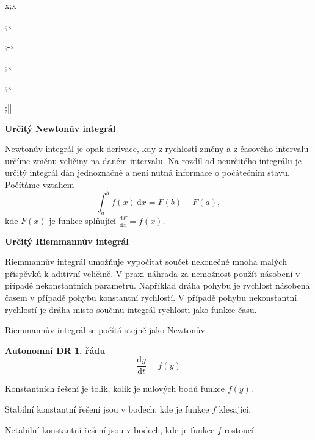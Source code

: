 \documentclass{article}
\def\tg{\mathop{\mathrm{tg}}}
\def\arctg{\mathop{\mathrm{arctg}}}
\def\cotg{\mathop{\mathrm{cotg}}}
\begin{document}
\begin{multicols}{3}
{{\begin{minipage}[t]{0.42\linewidth}
  \integral \cos x;\sin x

\end{minipage}\hfil\vrule\hfil
\begin{minipage}[t]{0.53\linewidth}
\parskip 3pt

  \integral {};\tg x

  \integral {};-\cotg x


  \integral {};\arcsin x

  \integral {};\arctg x

  \integral {};\ln\left|\right|

\end{minipage}}
}



\textbf{Určitý Newtonův integrál}

Newtonův integrál je opak derivace, kdy z rychlosti změny a z časového intervalu určíme změnu veličiny na daném intervalu. Na rozdíl od neurčitého integrálu je určitý integrál dán jednoznačně a není nutná informace o počátečním stavu. Počítáme vztahem 
$$\int_a^bf(x)\,\mathrm dx=F(b)-F(a),$$
kde $F(x)$ je funkce splňující $\frac{\mathrm dF}{\mathrm dx}=f(x).$

\textbf{Určitý Riemmannův integrál}

Riemmannův integrál umožňuje vypočítat součet nekonečné mnoha malých příspěvků k aditivní veličině. V praxi náhrada za nemožnost použít násobení v případě nekonstantních parametrů. Například dráha pohybu je rychlost násobená časem v případě pohybu konstantní rychlostí. V případě pohybu nekonstantní rychlostí je dráha místo součinu integrál rychlosti jako funkce času.

Riemmannův integrál se počítá stejně jako Newtonův. 

\vfill\null

\columnbreak


\textbf{Autonomní DR 1. řádu}
$$\frac{\mathrm dy}{\mathrm dt}=f(y)$$ 

Konstantních řešení je tolik, kolik je nulových bodů funkce $f(y)$.

Stabilní konstantní řešení jsou v bodech, kde je funkce $f$ klesající. 

Netabilní konstantní řešení jsou v bodech, kde je funkce $f$ rostoucí. 






\end{multicols}
\end{document}
